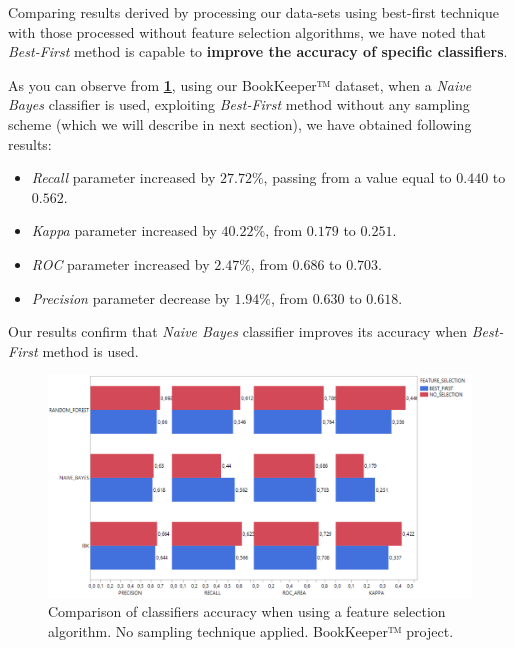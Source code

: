 \documentclass[sigconf]{acmart}
\begin{document}
Comparing results derived by processing our data-sets using best-first technique with those processed without feature selection algorithms, we have noted that \textit{Best-First} method is capable to \textbf{improve the accuracy of specific classifiers}.
 
As you can observe from \textbf{\cref{BOOKKEEPER-FeatureSelection}}, using our BookKeeper™ dataset, when a \textit{Naive Bayes} classifier is used, exploiting \textit{Best-First} method without any sampling scheme (which we will describe in next section), we have obtained following results:
\begin{itemize}
\item \textit{Recall} parameter increased by $27.72\%$, passing from a value equal to $0.440$ to $0.562$. 
\item \textit{Kappa} parameter increased by $40.22\%$, from $0.179$ to $0.251$. 
\item \textit{ROC} parameter increased by $2.47\%$, from $0.686$ to $0.703$.
\item \textit{Precision} parameter decrease by $1.94\%$, from $0.630$ to $0.618$.
\end{itemize}

Our results confirm that \textit{Naive Bayes} classifier improves its accuracy when \textit{Best-First} method is used. 

\begin{figure}[h!]
  \centering
  \includegraphics[width=\textwidth]{./BOOKKEEPER/FeatureSelection.png}
  \caption{Comparison of classifiers accuracy when using a feature selection algorithm. No sampling technique applied. \newline BookKeeper™ project. \newline}
  \label{BOOKKEEPER-FeatureSelection}
\end{figure}
\end{document}
